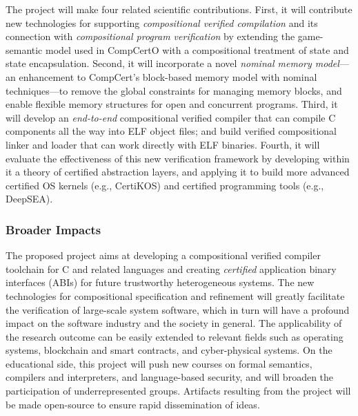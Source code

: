 The project will make four related scientific contributions.  First,
it will contribute new technologies for supporting {\em compositional
verified compilation} and its connection with {\em compositional
program verification} by extending the game-semantic model used in
CompCertO with a compositional treatment of state and state
encapsulation.  Second, it will incorporate a novel {\em nominal
memory model}---an enhancement to CompCert's block-based memory model
with nominal techniques---to remove the global constraints for
managing memory blocks, and enable flexible memory structures for open
and concurrent programs. Third, it will develop an {\em end-to-end}
compositional verified compiler that can compile C components all the
way into ELF object files; and build verified compositional linker and
loader that can work directly with ELF binaries.  Fourth, it will
evaluate the effectiveness of this new verification framework by
developing within it a theory of certified abstraction layers, and
applying it to build more advanced certified OS kernels (e.g.,
CertiKOS) and certified programming tools (e.g., DeepSEA).

\subsubsection*{Broader Impacts}

The proposed project aims at developing a compositional verified
compiler toolchain for C and related languages and creating {\em
certified} application binary interfaces (ABIs) for future trustworthy
heterogeneous systems. The new technologies for compositional
specification and refinement will greatly facilitate the verification
of large-scale system software, which in turn will have a profound impact
on the software industry and the society in general. The applicability
of the research outcome can be easily extended to relevant fields such
as operating systems, blockchain and smart contracts, and
cyber-physical systems.  On the educational side, this project will
push new courses on formal semantics, compilers and interpreters, and
language-based security, and will broaden the participation of
underrepresented groups.  Artifacts resulting from the project will be
made open-source to ensure rapid dissemination of ideas.


